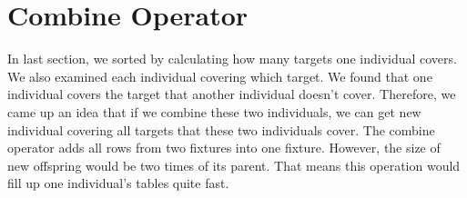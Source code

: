 \section{Combine Operator}

In last section, we sorted by calculating how many targets one individual covers. We also examined each individual covering which target. We found that one individual covers the target that another individual doesn’t cover. Therefore, we came up an idea that if we combine these two individuals, we can get new individual covering all targets that these two individuals cover. The combine operator adds all rows from two fixtures into one fixture. However, the size of new offspring would be two times of its parent. That means this operation would fill up one individual’s tables quite fast.